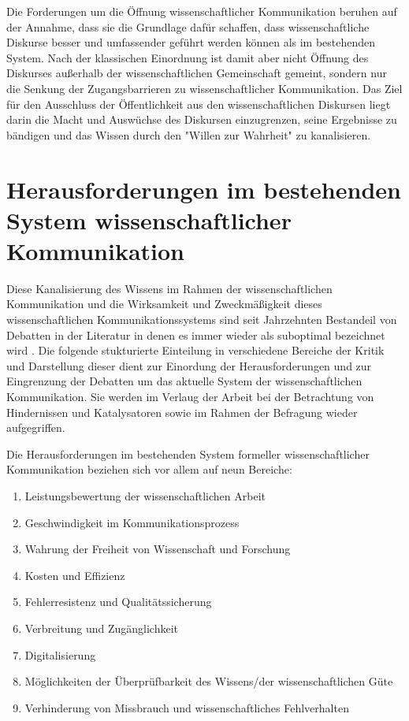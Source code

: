 Die Forderungen um die Öffnung wissenschaftlicher Kommunikation beruhen auf der Annahme, dass sie die Grundlage dafür schaffen, dass wissenschaftliche Diskurse besser und umfassender geführt werden können als im bestehenden System. Nach der klassischen Einordnung ist damit aber nicht Öffnung des Diskurses außerhalb der wissenschaftlichen Gemeinschaft gemeint, sondern nur die Senkung der Zugangsbarrieren zu wissenschaftlicher Kommunikation. Das Ziel für den Ausschluss der Öffentlichkeit aus den wissenschaftlichen Diskursen liegt darin die Macht und Auswüchse des Diskursen einzugrenzen, seine Ergebnisse zu bändigen und das Wissen durch den "Willen zur Wahrheit" \cite[:15]{foucault_1991_ordnung} zu kanalisieren.

\section{Herausforderungen im bestehenden System wissenschaftlicher Kommunikation}

Diese Kanalisierung des Wissens im Rahmen der wissenschaftlichen Kommunikation und die Wirksamkeit und Zweckmäßigkeit dieses wissenschaftlichen Kommunikationssystems sind seit Jahrzehnten Bestandeil von Debatten in der Literatur \cite{suchen} in denen es immer wieder als suboptimal bezeichnet wird \cite{suchen}. Die folgende stukturierte Einteilung in verschiedene Bereiche der Kritik und Darstellung dieser dient zur Einordung der Herausforderungen und zur Eingrenzung der Debatten um das aktuelle System der wissenschaftlichen Kommunikation. Sie werden im Verlaug der Arbeit bei der Betrachtung von Hindernissen und Katalysatoren sowie im Rahmen der Befragung wieder aufgegriffen.

Die Herausforderungen im bestehenden System formeller wissenschaftlicher Kommunikation beziehen sich vor allem auf neun Bereiche:
\begin{enumerate}
\item Leistungsbewertung der wissenschaftlichen Arbeit
\item Geschwindigkeit im Kommunikationsprozess
\item Wahrung der Freiheit von Wissenschaft und Forschung
\item Kosten und Effizienz
\item Fehlerresistenz und Qualitätssicherung
\item Verbreitung und Zugänglichkeit
\item Digitalisierung
\item Möglichkeiten der Überprüfbarkeit des Wissens/der wissenschaftlichen Güte
\item Verhinderung von Missbrauch und wissenschaftliches Fehlverhalten
\end{enumerate}

